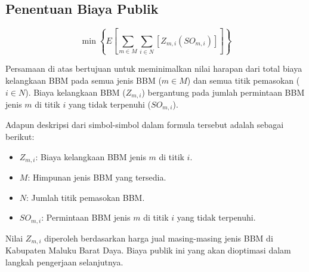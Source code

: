 \subsection{Penentuan Biaya Publik}
\label{subsec:awal-biaya-publik}

\begin{equation}
    \min\left\{E\left[\sum_{m\in M}\sum_{i\in N}[Z_{m,i}(SO_{m,i})]\right]\right\}
\end{equation}

Persamaan di atas bertujuan untuk meminimalkan nilai harapan dari total biaya kelangkaan BBM pada semua jenis BBM ($m \in M$) dan semua titik pemasokan ($i \in N$). Biaya kelangkaan BBM ($Z_{m,i}$) bergantung pada jumlah permintaan BBM jenis $m$ di titik $i$ yang tidak terpenuhi ($SO_{m,i}$).

Adapun deskripsi dari simbol-simbol dalam formula tersebut adalah sebagai berikut:
\begin{itemize}
    \item $Z_{m,i}$: Biaya kelangkaan BBM jenis $m$ di titik $i$.
    \item $M$: Himpunan jenis BBM yang tersedia.
    \item $N$: Jumlah titik pemasokan BBM.
    \item $SO_{m,i}$: Permintaan BBM jenis $m$ di titik $i$ yang tidak terpenuhi.
\end{itemize}

Nilai $Z_{m,i}$ diperoleh berdasarkan harga jual masing-masing jenis BBM di Kabupaten Maluku Barat Daya. Biaya publik ini yang akan dioptimasi dalam langkah pengerjaan selanjutnya.

